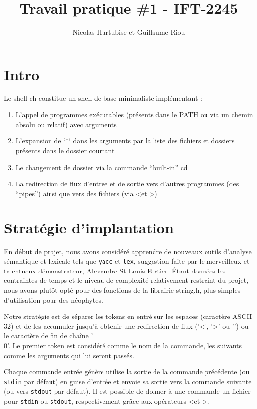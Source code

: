 \documentclass{article}
\title{Travail pratique \#1 - IFT-2245}
\author{Nicolas Hurtubise et Guillaume Riou}
\begin{document}
\maketitle

\section{Intro}

Le shell ch constitue un shell de base minimaliste implémentant :

\begin{enumerate}
\item L'appel de programmes exécutables (présents dans le PATH ou via un chemin absolu ou relatif) avec arguments
\item L'expansion de `*` dans les arguments par la liste des fichiers et dossiers présents dans le dossier courrant
\item Le changement de dossier via la commande ``built-in'' cd
\item La redirection de flux d'entrée et de sortie vers d'autres programmes (des ``pipes'') ainsi que vers des fichiers (via \textless et \textgreater)
\end{enumerate}

\section{Stratégie d'implantation}

En début de projet, nous avons considéré apprendre de nouveaux outils d'analyse sémantique et lexicale tels que \texttt{yacc} et \texttt{lex}, suggestion faite par le merveilleux et talentueux démonstrateur, Alexandre St-Louis-Fortier. Étant données les contraintes de temps et le niveau de complexité relativement restreint du projet, nous avons plutôt opté pour des fonctions de la librairie string.h, plus simples d'utilisation pour des néophytes.


Notre stratégie est de séparer les tokens en entré sur les espaces (caractère ASCII 32) et de les accumuler jusqu'à obtenir une redirection de flux ('\textless', '\textgreater' ou '\textbar') ou le caractère de fin de chaîne '\\0'. Le premier token est considéré comme le nom de la commande, les suivants comme les arguments qui lui seront passés.


Chaque commande entrée génère utilise la sortie de la commande précédente (ou \texttt{stdin} par défaut) en guise d'entrée et envoie sa sortie vers la commande suivante (ou vers \texttt{stdout} par défaut). Il est possible de donner à une commande un fichier pour \texttt{stdin} ou \texttt{stdout}, respectivement grâce aux opérateurs \textless et \textgreater.
\end{document}
